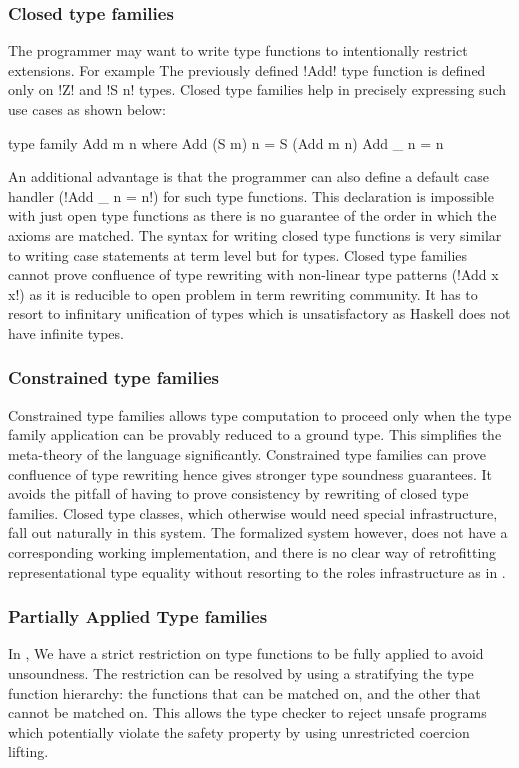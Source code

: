 \documentclass[manuscript,screen,nonacm]{acmart}
\begin{document}
\subsubsection{Closed type families}
The programmer may want to write type functions to intentionally restrict extensions. For example The previously defined !Add! type function is defined only on !Z! and !S n! types. Closed type families\cite{eisenberg_typefamilies_2014} help in precisely expressing such use cases as shown below:

\begin{CenteredBox}
\begin{code}
type family Add m n where
  Add (S m) n = S (Add m n)
  Add _ n = n
\end{code}
\end{CenteredBox}

An additional advantage is that the programmer can also define a default case handler (!Add _ n = n!) for such type functions. This declaration is impossible with just open type functions as there is no guarantee of the order in which the axioms are matched. The syntax for writing closed type functions is very similar to writing case statements at term level but for types. Closed type families cannot prove confluence of type rewriting with non-linear type patterns (!Add x x!) as it is reducible to open problem in term rewriting community\cite{TODO}. It has to resort to infinitary unification of types which is unsatisfactory as Haskell does not have infinite types.

\subsubsection{Constrained type families}
Constrained type families allows type computation to proceed only when the type family application can be provably reduced to a ground type. This simplifies the meta-theory of the language significantly. Constrained type families can prove confluence of type rewriting hence gives stronger type soundness guarantees. It avoids the pitfall of having to prove consistency by rewriting of closed type families. Closed type classes, which otherwise would need special infrastructure, fall out naturally in this system. The formalized system however, does not have a corresponding  working implementation, and there is no clear way of retrofitting representational type equality without resorting to the roles infrastructure as in \SFR.

\subsubsection{Partially Applied Type families}
In \SFC, We have a strict restriction on type functions to be fully applied to avoid unsoundness. The restriction can be resolved by using a stratifying the type function hierarchy\cite{kiss_higher-order_2019}: the functions that can be matched on, and the other that cannot be matched on. This allows the type checker to reject unsafe programs which potentially violate the safety property by using unrestricted coercion lifting.
\end{document}
